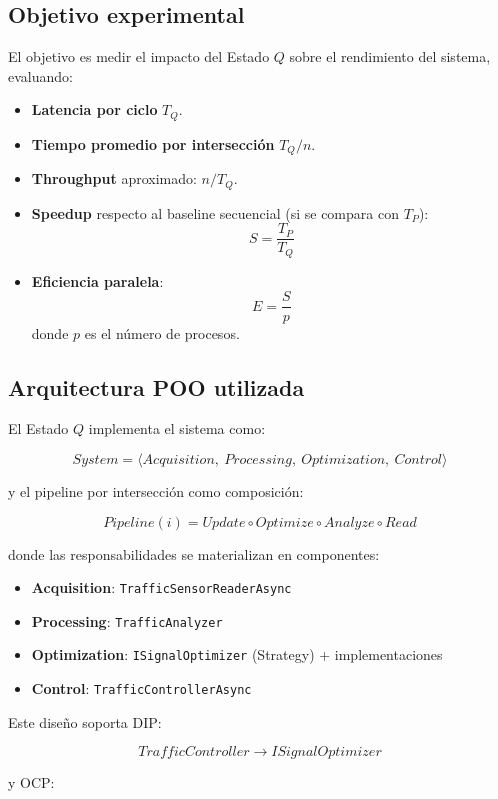 \documentclass[12pt]{article}
\begin{document}
\subsection{Objetivo experimental}

El objetivo es medir el impacto del Estado \(Q\) sobre el rendimiento del sistema,
evaluando:

\begin{itemize}
\item \textbf{Latencia por ciclo} \(T_Q\).
\item \textbf{Tiempo promedio por intersección} \(T_Q/n\).
\item \textbf{Throughput} aproximado: \(n/T_Q\).
\item \textbf{Speedup} respecto al baseline secuencial (si se compara con \(T_P\)):
\[
S = \frac{T_P}{T_Q}
\]
\item \textbf{Eficiencia paralela}:
\[
E = \frac{S}{p}
\]
donde \(p\) es el número de procesos.
\end{itemize}

\subsection{Arquitectura POO utilizada}

El Estado \(Q\) implementa el sistema como:

\[
System = \langle Acquisition,\ Processing,\ Optimization,\ Control \rangle
\]

y el pipeline por intersección como composición:

\[
Pipeline(i) = Update \circ Optimize \circ Analyze \circ Read
\]

donde las responsabilidades se materializan en componentes:

\begin{itemize}
\item \textbf{Acquisition}: \texttt{TrafficSensorReaderAsync}
\item \textbf{Processing}: \texttt{TrafficAnalyzer}
\item \textbf{Optimization}: \texttt{ISignalOptimizer} (Strategy) + implementaciones
\item \textbf{Control}: \texttt{TrafficControllerAsync}
\end{itemize}

Este diseño soporta DIP:

\[
TrafficController \rightarrow ISignalOptimizer
\]

y OCP:
\end{document}
